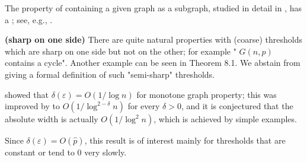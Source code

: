 \documentclass{article}
\newcommand{\bfs}[1]{\textbf{({#1}) }}
\begin{document}
\begin{exma}\label{exm22}
The property of containing a given graph as a subgraph, studied in detail in \cite[Chapter 3]{janson2011random}, has a ; see, e.g., \cite[Theorem 3.9]{janson2011random}.
\end{exma} 
\begin{rema}{\bfs{sharp on one side}}
There are quite natural properties with (coarse) thresholds which are sharp on one side but not on the other; for example " $G (n, p)$ contains a cycle". Another example can be seen in Theorem 8.1. We abstain from giving a formal definition of such "semi-sharp" thresholds. 
\end{rema}



\cite{friedgut1996every} showed that $\delta(\varepsilon)=O(1 / \log n)$ for  monotone graph property; this was improved by \cite{bourgain1997influences} to $O\left(1 / \log ^{2-\delta} n\right)$ for every $\delta>0$, and it is conjectured that the absolute width is actually $O\left(1 / \log ^{2} n\right)$, which is achieved by simple examples. 
\begin{rema}
Since $\delta(\varepsilon)=O(\widehat{p})$, this result is of interest mainly for thresholds that are constant or tend to 0 very slowly.
\end{rema}
\end{document}
